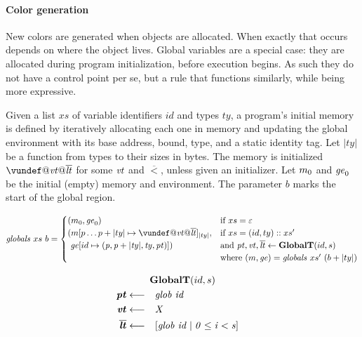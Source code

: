 \documentclass[acmsmall,review,anonymous]{acmart}\settopmatter{printfolios=true,printccs=false,printacmref=false}
\begin{document}
\paragraph*{Color generation}

New colors are generated when objects are allocated. When exactly that occurs
depends on where the object lives. Global variables are a special case: they are
allocated during program initialization, before execution begins. As such they
do not have a control point per se, but a rule that functions similarly, while
being more expressive.


Given a list \(xs\) of variable identifiers \(id\) and types
\(ty\), a program's initial memory is defined by iteratively allocating each one
in memory and updating the global environment with its base address, bound, type,
and a static identity tag. Let \(|ty|\) be a function from types to their sizes
in bytes. The memory is initialized \(\vundef@\vt@\overline{\lt}\)
for some \(\mathit{vt}\) and \(\overline{\lt}\), unless given an initializer.
Let \(m_0\) and \(\mathit{ge}_0\) be the initial (empty) memory and environment.
The parameter \(b\) marks the start of the global region.


\[\mathit{globals} ~ xs ~ b =
\begin{cases}
  (\mem_0, \genv_0) & \textnormal{if } xs = \varepsilon \\
  (\mem[p \dots p+|ty| \mapsto \vundef@\vt@\overline{\lt}]_{|ty|}, & \textnormal{if } xs = (id,ty)::xs' \\
  ~ \genv[id \mapsto (\mathit{p, p+|ty|,ty,\pt})]) & \textnormal{and } \trule{\globaltres}{\globalt} \\
  & \textnormal{where } (\mem,\genv) = \mathit{globals} ~ xs' ~ (b + |ty|) \\
\end{cases}\]

\[\begin{aligned}
\truledef{\globalt}
\settag{\pt}{\mathit{glob ~ id}}
\settag{\vt}{X}
\settag{\overline{\lt}}{\left[\mathit{glob} ~ id \mid 0 \leq i < s\right]}
\end{aligned}\]
\end{document}
